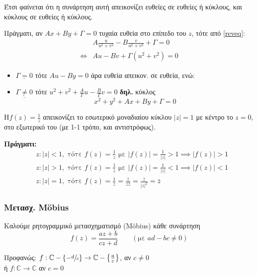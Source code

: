 \documentclass[12pt,a4paper,notitlepage,fleqn]{article}
\begin{document}
     Έτσι φαίνεται ότι η συνάρτηση αυτή απεικονίζει ευθείες σε ευθείες ή κύκλους,
     και κύκλους σε ευθείες ή κύκλους.

     Πράγματι, αν
     \( Ax+By+\Gamma = 0 \) τυχαία ευθεία στο επίπεδο του \( z \), τότε
     από \eqref{reveq}:
     \begin{align*}
     & A\frac{u}{u^2+v^2} - B \frac{v}{u^2+v^2} + \Gamma = 0
     \\ \iff & \boxed{
     	Au-Bv + \Gamma\left( u^2+v^2 \right) = 0
     	}
     \end{align*}

     \begin{itemize}
     	\item \( \underline{\Gamma = 0} \) τότε \( Au-By = 0 \)
     	άρα ευθεία απεικον. σε ευθεία, ενώ:
     	\item \( \underline{\Gamma \neq 0} \) τότε \(
     	u^2+v^2+\frac{A}{\Gamma}u-\frac{B}{\Gamma}v = 0
     	 \) \textbf{δηλ.} κύκλος
     	 \[
     	 x^2+y^2+Ax+By+\Gamma = 0
     	 \]
     \end{itemize}

     Η\( f(z) = \frac{1}{z} \) απεικονίζει το εσωτερικό μοναδιαίου κύκλου
     \( |z| = 1 \) με κέντρο το \( z=0 \), στο εξωτερικό του (με 1-1 τρόπο, και
     αντιστρόφως).

     \textbf{Πράγματι:}
     \begin{align*}
     & z: |z| < 1, \text{ τότε } f(z) = \frac{1}{z} \text{ με } \left|f(z)\right|
     = \frac{1}{|z|}>1 \implies \left|f(z)\right|> 1 \\
     & z: |z| > 1, \text{ τότε } f(z) = \frac{1}{z} \text{ με } \left|f(z)\right|
      = \frac{1}{|z|}<1 \implies \left|f(z)\right|< 1 \\
     & z: |z| = 1, \text{ τότε } f(z) = \frac{1}{z} = \frac{\bar z}{z\bar z}
     = \frac{\bar z}{|z|^2} = \bar z
     \end{align*}

     \subsubsection{Μετασχ. M\"obius}
     Καλούμε ρητογραμμικό μετασχηματισμό (M\"obius) κάθε συνάρτηση
     \[
     f(z) = \frac{az+b}{cz+d}\qquad (\text{με } ad-bc \neq 0)
     \]

     Προφανώς: \( f: \mathbb C - \left\lbrace - \sfrac{d}{c}  \right\rbrace
     \to \mathbb C  - \left\lbrace \frac{a}{c} \right\rbrace
     \), αν \( c \neq 0 \)
     \\ ή \( f: \mathbb C \to \mathbb C \) \quad αν \( c = 0 \)
\end{document}
